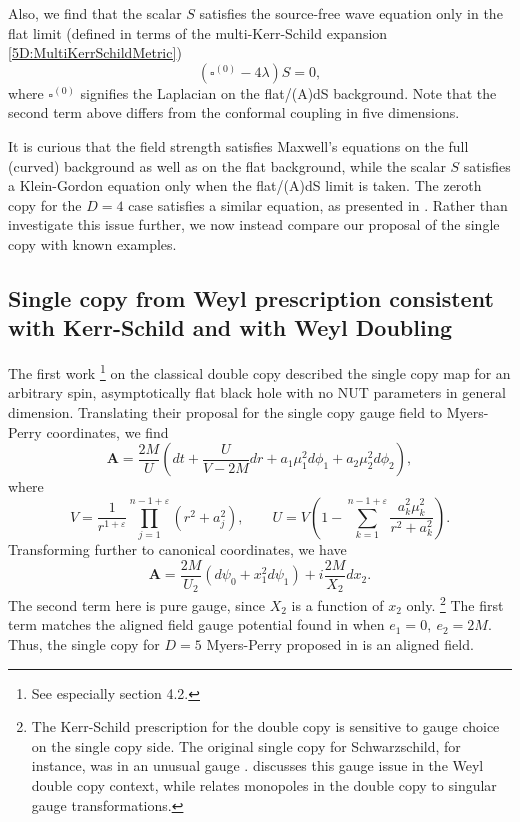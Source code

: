 Also, we find that the scalar $S$ satisfies the source-free wave equation only in the flat limit (defined in terms of the multi-Kerr-Schild expansion
\eqref{5D:MultiKerrSchildMetric}) 
%
 \begin{equation} 
     \left(\square^{(0)} - 4 \lambda\right) S = 0,
 \end{equation}
 where $ \square^{(0)}$ signifies the Laplacian on the flat/(A)dS
 background. Note that the second term above differs from the
 conformal coupling in five dimensions.

It is curious that the field strength satisfies Maxwell's equations on the full (curved) background as
well as on the flat background, while the scalar $S$
satisfies a Klein-Gordon equation only when the flat/(A)dS limit is taken. The zeroth copy for the $D = 4$ case
satisfies a similar equation, as presented in \cite{Luna:2015paa}. Rather than investigate this issue further, we now instead compare our proposal of the single copy with known examples.

\subsection{Single copy from Weyl prescription consistent with Kerr-Schild and with Weyl
Doubling}
%
The first work \cite{Monteiro:2014cda}%
%
\footnote{See especially section 4.2.}
%
 on the classical double copy described the single copy map for an
arbitrary spin, asymptotically flat black hole with no NUT parameters in general dimension. Translating their proposal for the single copy gauge field to
Myers-Perry coordinates, we find
%
\begin{equation} 
    \mathbf{A} = \frac{2M}{U} \left( dt + \frac{U}{V - 2M} dr + a_{1} \mu_{1}^{2}
    d\phi_{1} + a_{2} \mu_{2}^{2} d\phi_{2}\right),
\end{equation}
%
where
%
\begin{equation} 
    V = \frac{1}{r^{1 + \varepsilon}} \prod_{j = 1}^{n - 1 + \varepsilon} (r^{2} +
    a_{j}^{2}), \qquad U = V\left(1 - \sum_{k  = 1}^{n - 1 + \varepsilon}
    \frac{a_{k}^{2}\mu_{k}^{2}}{r^{2} + a_{k}^{2}}\right).
\end{equation}
%
Transforming further to canonical coordinates, we have
%
\begin{equation} 
    \mathbf{A} = \frac{2M}{U_{2}} \left( d\psi_{0} + x_{1}^{2} d\psi_{1} \right) + i
    \frac{2M}{X_{2}} dx_{2}.
\end{equation}
%
The second term here is pure gauge, since $X_{2}$ is a function of
$x_{2}$ only.%
%
\footnote{The Kerr-Schild prescription for the double copy is sensitive to gauge choice on the
single copy side. The original single copy for Schwarzschild, for instance, was in an unusual gauge
\cite{Monteiro:2014cda}. \cite{Godazgar:2021iae} discusses this gauge issue in the Weyl double copy context, while \cite{Bahjat-Abbas:2020cyb} relates monopoles in the double copy to singular gauge transformations.} %
%
The first term matches the aligned
field gauge potential found in \cite{Krtous:2007xg} when $e_{1} = 0,\ e_{2} = 2M$. Thus, the single copy for $D = 5$ Myers-Perry proposed in
\cite{Monteiro:2014cda} is an aligned field.


